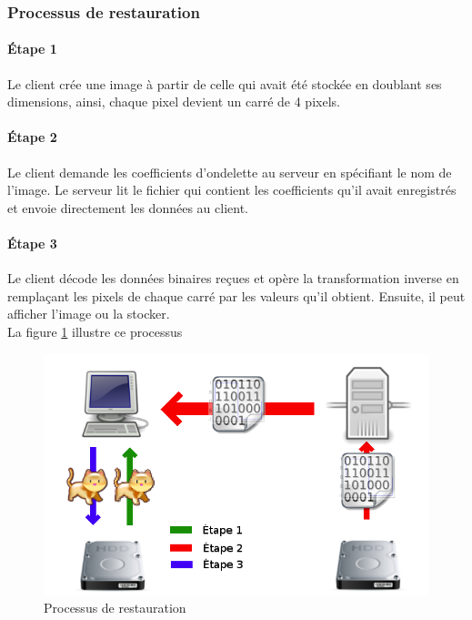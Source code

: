 \documentclass{article}
\begin{document}
\subsubsection{Processus de restauration}

\paragraph{Étape 1}

Le client crée une image à partir de celle qui avait été stockée en doublant ses dimensions, ainsi, chaque pixel devient un carré de 4 pixels.

\paragraph{Étape 2}

Le client demande les coefficients d'ondelette au serveur en spécifiant le nom de l'image. Le serveur lit le fichier qui contient les coefficients qu'il avait enregistrés et envoie directement les données au client.

\paragraph{Étape 3}

Le client décode les données binaires reçues et opère la transformation inverse en remplaçant les pixels de chaque carré par les valeurs qu'il obtient. Ensuite, il peut afficher l'image ou la stocker.\\

La figure \ref{load} illustre ce processus

 
\begin{figure}[!h]
\centering
\includegraphics[scale=0.5]{images/load.png}
\caption{Processus de restauration}
\label{load}
\end{figure}
\end{document}
